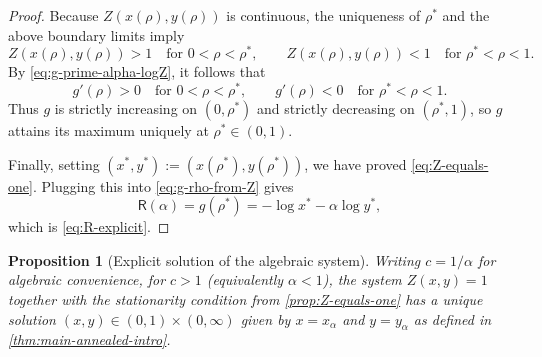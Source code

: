 \documentclass[11pt]{amsart}
\numberwithin{equation}{section}
\numberwithin{equation}{section}
\newcommand{\1}{\mathbbm{1}}
\newtheorem{proposition}[theorem]{Proposition}
\theoremstyle{definition}
\begin{document}
\begin{proof}
Because \(Z(x(\rho),y(\rho))\) is continuous, the uniqueness of \(\rho^*\) and
the above boundary limits imply
\[
Z(x(\rho),y(\rho))>1 \quad \text{for } 0<\rho<\rho^*,
\qquad
Z(x(\rho),y(\rho))<1 \quad \text{for } \rho^*<\rho<1.
\]
By \eqref{eq:g-prime-alpha-logZ}, it follows that
\[
g'(\rho)>0 \quad \text{for } 0<\rho<\rho^*,
\qquad
g'(\rho)<0 \quad \text{for } \rho^*<\rho<1.
\]
Thus \(g\) is strictly increasing on \((0,\rho^*)\) and strictly decreasing on
\((\rho^*,1)\), so \(g\) attains its maximum uniquely at \(\rho^*\in(0,1)\).

Finally, setting \((x^*,y^*):=(x(\rho^*),y(\rho^*))\), we have proved
\eqref{eq:Z-equals-one}. Plugging this into \eqref{eq:g-rho-from-Z} gives
\[
\mathsf R(\alpha)=g(\rho^*)=-\log x^*-\alpha\log y^*,
\]
which is \eqref{eq:R-explicit}.
\end{proof}


\begin{proposition}[Explicit solution of the algebraic system]\label{prop:explicit-solution}
Writing $c = 1/\alpha$ for algebraic convenience, for $c>1$ (equivalently $\alpha < 1$), the system $Z(x,y)=1$ together with the stationarity condition from
\cref{prop:Z-equals-one} has a unique solution $(x,y)\in(0,1)\times(0,\infty)$
given by $x=x_\alpha$ and $y=y_\alpha$ as defined in \cref{thm:main-annealed-intro}.
\end{proposition}
\end{document}
